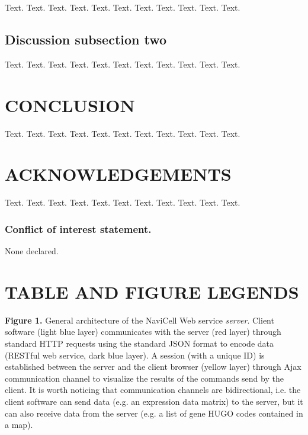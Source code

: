 \documentclass[a4,center,fleqn]{NAR}
\begin{document}
Text. Text. Text. Text. Text. Text. Text. Text. Text. Text. Text.

\subsection{Discussion subsection two}

Text. Text. Text. Text. Text. Text. Text. Text. Text. Text. Text.

\section{CONCLUSION}

Text. Text. Text. Text. Text. Text. Text. Text. Text. Text. Text.

\section{ACKNOWLEDGEMENTS}

Text. Text. Text. Text. Text. Text. Text. Text. Text. Text. Text.


\subsubsection{Conflict of interest statement.} None declared.
\newpage



\section{TABLE AND FIGURE LEGENDS}

\textbf{Figure 1.} General architecture of the NaviCell Web service
\emph{server}. Client software (light blue layer) communicates with the server
(red layer) through standard HTTP requests using the standard JSON format to
encode data (RESTful web service, dark blue layer). A session (with a unique ID)
is established between the server and the client browser (yellow layer) through
Ajax communication channel to visualize the results of the commands send by the
client. It is worth noticing that communication channels are bidirectional, i.e.
the client software can send data (e.g. an expression data matrix) to the
server, but it can also receive data from the server (e.g. a list of gene HUGO
codes contained in a map).
\end{document}

